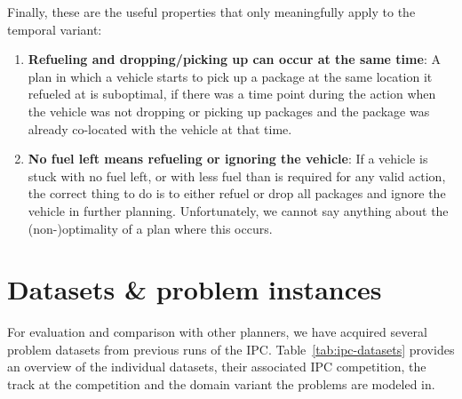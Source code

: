 Finally, these are the useful properties that only meaningfully apply to the temporal variant:
\begin{enumerate}
\item \textbf{Refueling and dropping/picking up can occur at the same time}: 
A plan in which a vehicle starts to pick up a package at the same location it refueled at is suboptimal, if there was a time point during the  action
when the vehicle was not dropping or picking up packages and the package was already
co-located with the vehicle at that time.

\item \textbf{No fuel left means refueling or ignoring the vehicle}:
If a vehicle is stuck with no fuel left, or with less fuel than is required for
any valid \drive{} action,
the correct thing to do is to either refuel or drop all packages and ignore the vehicle in further planning. Unfortunately,
we cannot say anything about the (non-)optimality of a plan where this occurs.
\end{enumerate}
















\section{Datasets \& problem instances}\label{datasets}

For evaluation and comparison with other planners, we have acquired several problem datasets from previous runs of the IPC.
Table~\ref{tab:ipc-datasets} provides an overview of the individual datasets, their associated IPC competition, the track at the competition and the domain variant the problems are modeled in.

